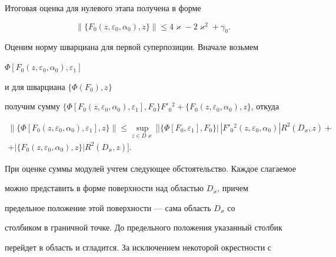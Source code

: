 Итоговая оценка для нулевого этапа получена в форме


\begin{equation}


\|\{F_0 ({z,\varepsilon_0,\alpha_0} ),z\} \| \le 


4\varkappa-2\varkappa^2+\gamma_0. 


\end{equation}





Оценим норму шварциана для первой суперпозиции. Вначале возьмем 


$\Phi [{F_0 ({z,\varepsilon_0,\alpha_0} ),\varepsilon _1} ]$


и для шварциана $\{\Phi ({F_0} ),z\}$ 


получим сумму $\{\Phi [{F_0 ({z,\varepsilon_0,\alpha_0 


}),\varepsilon_1} ],F_0\} F'_0{}^2 


+\{F_0 ({z,\varepsilon_0,\alpha_0} ),z\} $, откуда


\begin{multline}


\|\{\Phi [{F_0 ({z,\varepsilon_0,\alpha_0} 


),\varepsilon_1} ],z\} \| \le 


\sup_{z \in D\varkappa}[|


\{\Phi [{F_0,\varepsilon_1} ],F_0 \}|\,


|F'_0{}^2 ({z,\varepsilon_0,\alpha_0} )|


R^2({D_{\varkappa},z})+ \\


%


+|\{F_0 ({z,\varepsilon_0,\alpha_0} ),z\} 


|R^2({D_{\varkappa},z})].


\end{multline}





При оценке суммы модулей учтем следующее обстоятельство. Каждое слагаемое 


можно представить в форме поверхности над областью $D_{\varkappa}$, причем 


предельное положение этой поверхности --- сама область $D_{\varkappa}$  со 


столбиком в граничной точке. До предельного положения указанный столбик 


перейдет в область и сгладится. За исключением некоторой окрестности с 


